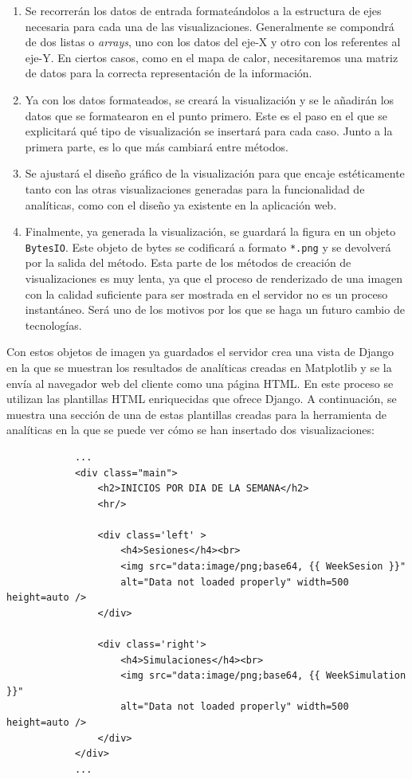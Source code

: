 \documentclass[a4paper, 12pt]{book}
\begin{document}
		\begin{enumerate}
			\item Se recorrerán los datos de entrada formateándolos a la estructura de ejes necesaria para cada una de las visualizaciones. Generalmente se compondrá de dos listas o \textit{arrays}, uno con los datos del eje-X y otro con los referentes al eje-Y. En ciertos casos, como en el mapa de calor, necesitaremos una matriz de datos para la correcta representación de la información. \\
			
			\item Ya con los datos formateados, se creará la visualización y se le añadirán los datos que se formatearon en el punto primero. Este es el paso en el que se explicitará qué tipo de visualización se insertará para cada caso. Junto a la primera parte, es lo que más cambiará entre métodos. \\
			
			\item Se ajustará el diseño gráfico de la visualización para que encaje estéticamente tanto con las otras visualizaciones generadas para la funcionalidad de analíticas, como con el diseño ya existente en la aplicación web.\\
			
			\item Finalmente, ya generada la visualización, se guardará la figura en un objeto \texttt{BytesIO}. Este objeto de bytes se codificará a formato \texttt{*.png} y se devolverá por la salida del método. Esta parte de los métodos de creación de visualizaciones es muy lenta, ya que el proceso de renderizado de una imagen con la calidad suficiente para ser mostrada en el servidor no es un proceso instantáneo. Será uno de los motivos por los que se haga un futuro cambio de tecnologías.\\
		\end{enumerate}
		
		\clearpage
		Con estos objetos de imagen ya guardados el servidor crea una vista de Django en la que se muestran los resultados de analíticas creadas en Matplotlib y se la envía al navegador web del cliente como una página HTML. En este proceso se utilizan las plantillas HTML enriquecidas que ofrece Django. A continuación, se muestra una sección de una de estas plantillas creadas para la herramienta de analíticas en la que se puede ver cómo se han insertado dos visualizaciones:
		
		{\footnotesize
		\begin{verbatim}
			...
			<div class="main">
			    <h2>INICIOS POR DIA DE LA SEMANA</h2>
			    <hr/>
			
			    <div class='left' >
			        <h4>Sesiones</h4><br>
			        <img src="data:image/png;base64, {{ WeekSesion }}" 
			        alt="Data not loaded properly" width=500 height=auto />
			    </div>
			
			    <div class='right'>
			        <h4>Simulaciones</h4><br>
			        <img src="data:image/png;base64, {{ WeekSimulation }}" 
			        alt="Data not loaded properly" width=500 height=auto />
			    </div>
			</div>
			...
		\end{verbatim}
		}
			
\end{document}

